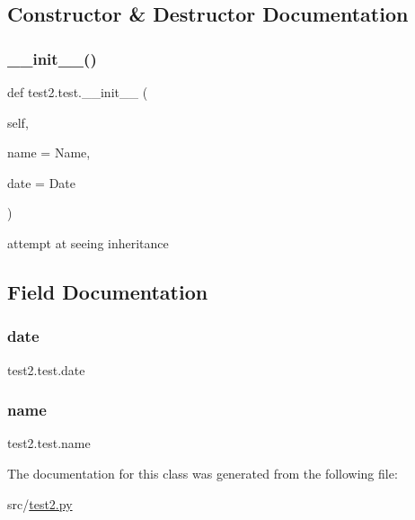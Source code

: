 \subsection{Constructor \& Destructor Documentation}
\mbox{\label{classtest2_1_1test_aa61f121f89d9b8e4d6ee2e28908a4719}} 
\subsubsection{\texorpdfstring{\_\_init\_\_()}{\_\_init\_\_()}}
{\footnotesize\ttfamily def test2.\+test.\+\_\+\+\_\+init\+\_\+\+\_\+ (\begin{DoxyParamCaption}\item[{}]{self,  }\item[{}]{name = {\ttfamily \textquotesingle{}Name\textquotesingle{}},  }\item[{}]{date = {\ttfamily \textquotesingle{}Date\textquotesingle{}} }\end{DoxyParamCaption})}

\begin{DoxyVerb}attempt at seeing inheritance \end{DoxyVerb}
 

\subsection{Field Documentation}
\mbox{\label{classtest2_1_1test_a1fb510bf063d6341ec863dd1fd9b9e54}} 
\subsubsection{\texorpdfstring{date}{date}}
{\footnotesize\ttfamily test2.\+test.\+date}

\mbox{\label{classtest2_1_1test_afed0734169aa1b3cb3291c0a55acc134}} 
\subsubsection{\texorpdfstring{name}{name}}
{\footnotesize\ttfamily test2.\+test.\+name}



The documentation for this class was generated from the following file\+:\begin{DoxyCompactItemize}
\item 
src/\mbox{\hyperlink{test2_8py}{test2.\+py}}\end{DoxyCompactItemize}
